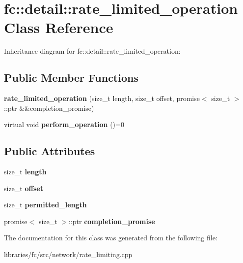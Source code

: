 \hypertarget{classfc_1_1detail_1_1rate__limited__operation}{}\section{fc\+:\+:detail\+:\+:rate\+\_\+limited\+\_\+operation Class Reference}
\label{classfc_1_1detail_1_1rate__limited__operation}


Inheritance diagram for fc\+:\+:detail\+:\+:rate\+\_\+limited\+\_\+operation\+:
\subsection*{Public Member Functions}
\begin{DoxyCompactItemize}
\item 
\mbox{\label{classfc_1_1detail_1_1rate__limited__operation_aa04333ce2124f5041df4d4c29edf6c43}} 
{\bfseries rate\+\_\+limited\+\_\+operation} (size\+\_\+t length, size\+\_\+t offset, promise$<$ size\+\_\+t $>$\+::ptr \&\&completion\+\_\+promise)
\item 
\mbox{\label{classfc_1_1detail_1_1rate__limited__operation_a7090878b9387f70e1718021b5fc596cb}} 
virtual void {\bfseries perform\+\_\+operation} ()=0
\end{DoxyCompactItemize}
\subsection*{Public Attributes}
\begin{DoxyCompactItemize}
\item 
\mbox{\label{classfc_1_1detail_1_1rate__limited__operation_ae8457a63170710103e077ec951c26564}} 
size\+\_\+t {\bfseries length}
\item 
\mbox{\label{classfc_1_1detail_1_1rate__limited__operation_a6ba877d2a0fdcb8b029af48feb07421f}} 
size\+\_\+t {\bfseries offset}
\item 
\mbox{\label{classfc_1_1detail_1_1rate__limited__operation_ae0ebd3357543b80e348bf68b75b796ad}} 
size\+\_\+t {\bfseries permitted\+\_\+length}
\item 
\mbox{\label{classfc_1_1detail_1_1rate__limited__operation_ac8b6e31c5908b626e58252fe8048f8b9}} 
promise$<$ size\+\_\+t $>$\+::ptr {\bfseries completion\+\_\+promise}
\end{DoxyCompactItemize}


The documentation for this class was generated from the following file\+:\begin{DoxyCompactItemize}
\item 
libraries/fc/src/network/rate\+\_\+limiting.\+cpp\end{DoxyCompactItemize}
